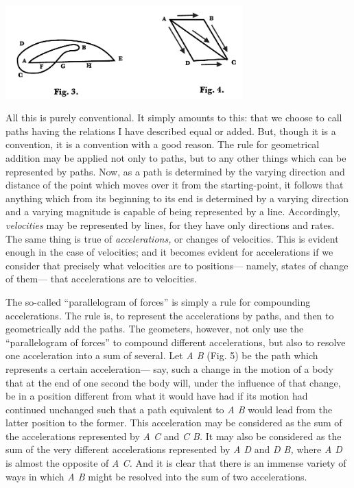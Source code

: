 \documentclass[]{article}
\begin{document}
\includegraphics[width=3.6in]{peirce-howto2.pdf}

All this is purely conventional. It simply amounts to this: that we choose to call paths having the relations I have described equal or added. But, though it is a convention, it is a convention with a good reason. The rule for geometrical addition may be applied not only to paths, but to any other things which can be represented by paths. Now, as a path is determined by the varying direction and distance of the point which moves over it from the starting-point, it follows that anything which from its beginning to its end is determined by a varying direction and a varying magnitude is capable of being represented by a line. Accordingly, \emph{velocities} may be represented by lines, for they have only directions and rates. The same thing is true of \emph{accelerations,} or changes of velocities. This is evident enough in the case of velocities; and it becomes evident for accelerations if we consider that precisely what velocities are to positions--- namely, states of change of them--- that accelerations are to velocities.


The so-called ``parallelogram of forces'' is simply a rule for compounding accelerations. The rule is, to represent the accelerations by paths, and then to geometrically add the paths. The geometers, however, not only use the ``parallelogram of forces'' to compound different accelerations, but also to resolve one acceleration into a sum of several. Let \emph{A B} (Fig. 5) be the path which represents a certain acceleration--- say, such a change in the motion of a body that at the end of one second the body will, under the influence of that change, be in a position different from what it would have had if its motion had  continued unchanged such that a path equivalent to \emph{A B} would lead from the latter position to the former. This acceleration may be considered as the sum of the accelerations represented by \emph{A C} and \emph{C B.} It may also be considered as the sum of the very different accelerations represented by \emph{A D} and \emph{D B,} where \emph{A D} is almost the opposite of \emph{A C.} And it is clear that there is an immense variety of ways in which \emph{A B} might be resolved into the sum of two accelerations.
\end{document}
